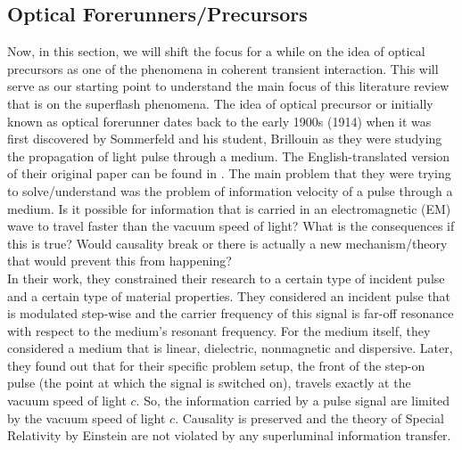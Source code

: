 \subsection{Optical Forerunners/Precursors}\label{precursor}
Now, in this section, we will shift the focus for a while on the idea of optical precursors as one of the phenomena in coherent transient interaction. This will serve as our starting point to understand the main focus of this literature review that is on the superflash phenomena. The idea of optical precursor or initially known as optical forerunner dates back to the early 1900s (1914) when it was first discovered by Sommerfeld and his student, Brillouin as they were studying the propagation of light pulse through a medium. The English-translated version of their original paper can be found in \cite{brillouin1969wave}. The main problem that they were trying to solve/understand was the problem of information velocity of a pulse through a medium. Is it possible for information that is carried in an electromagnetic (EM) wave to travel faster than the vacuum speed of light? What is the consequences if this is true? Would causality break or there is actually a new mechanism/theory that would prevent this from happening?\\

In their work, they constrained their research to a certain type of incident pulse and a certain type of material properties. They considered an incident pulse that is modulated step-wise and the carrier frequency of this signal is far-off resonance with respect to the medium's resonant frequency. For the medium itself, they considered a medium that is linear, dielectric, nonmagnetic and dispersive. Later, they found out that for their specific problem setup, the front of the step-on pulse (the point at which the signal is switched on), travels exactly at the vacuum speed of light $c$. So, the information carried by a pulse signal are limited by the vacuum speed of light $c$. Causality is preserved and the theory of Special Relativity by Einstein are not violated by any superluminal information transfer.\\

